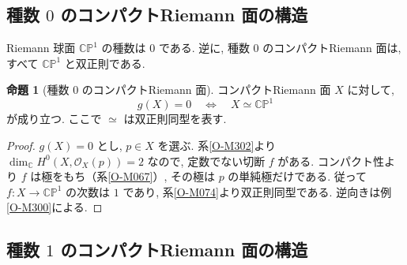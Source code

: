 \documentclass[dvipdfmx,a4paper,11pt]{article} %
\newcommand{\C}{\mathbb{C}}
\theoremstyle{definition}
\numberwithin{equation}{section}
\newtheorem{prop}[thm]{命題}
\begin{document}
\subsection{種数 $0$ のコンパクトRiemann 面の構造}
\label{O-S063}

Riemann 球面 $\C\mathbb P^1$ の種数は $0$ である.
逆に, 種数 $0$ のコンパクトRiemann 面は, 
すべて $\C\mathbb P^1$ と双正則である.

\begin{prop}[種数 $0$ のコンパクトRiemann 面]\label{O-M351}
コンパクトRiemann 面 $X$ に対して, 
\[
g(X)=0
\quad\Longleftrightarrow\quad
X\simeq\C\mathbb P^1
\]
が成り立つ.
ここで $\simeq$ は双正則同型を表す.
\end{prop}

\begin{proof}
$g(X)=0$ とし, $p\in X$ を選ぶ.
系\ref{O-M302}より $\dim_\C H^0(X,\mathcal O_X(p))=2$ なので,
定数でない切断 $f$ がある.
コンパクト性より $f$ は極をもち（系\ref{O-M067}）, その極は $p$ の単純極だけである.
従って $f:X\to\C\mathbb P^1$ の次数は $1$ であり, 系\ref{O-M074}より双正則同型である.
逆向きは例\ref{O-M300}による.
\end{proof}




\subsection{種数 $1$ のコンパクトRiemann 面の構造}
\label{O-S063-genus-one}
\end{document}
